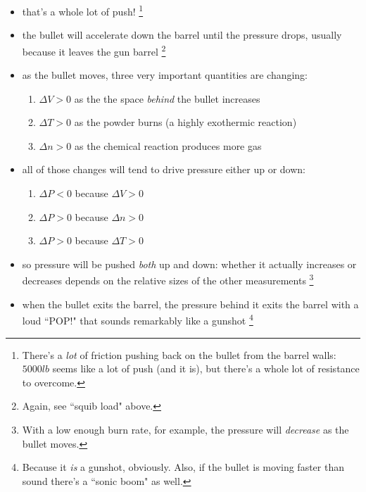 \documentclass[11pt, oneside]{article}   	%
\begin{document}
\begin{itemize}
\item that's a whole lot of push!
\footnote{There's a \emph{lot} of friction pushing back on the bullet from the barrel walls: $5000 lb$ seems like a lot of push (and it is), but there's a whole lot of resistance to overcome. }
\item the bullet will accelerate down the barrel until the pressure drops, usually because it leaves the gun barrel
\footnote{Again, see ``squib load" above.}
\item as the bullet moves, three very important quantities are changing:
\begin{enumerate}
\item $\Delta V > 0$  as the the space \emph{behind} the bullet increases
\item $\Delta T > 0$ as the powder burns (a highly exothermic reaction)
\item $\Delta n > 0$ as the chemical reaction produces more gas
\end{enumerate}

\item all of those changes will tend to drive pressure either up or down:
\begin{enumerate}
\item $\Delta P < 0$  because $\Delta V > 0$
\item $\Delta P > 0$  because $\Delta n > 0$
\item $\Delta P > 0$ because $\Delta T > 0$
\end{enumerate}

\item so pressure will be pushed \emph{both} up and down: whether it actually increases or decreases depends on the relative sizes of the other measurements
\footnote{With a low enough burn rate, for example, the pressure will \emph{decrease} as the bullet moves.}

\item when the bullet exits the barrel, the pressure behind it exits the barrel with a loud ``POP!" that sounds remarkably like a gunshot
\footnote{Because it \emph{is} a gunshot, obviously. Also, if the bullet is moving faster than sound there's a ``sonic boom" as well.}
\end{itemize}
\end{document}
